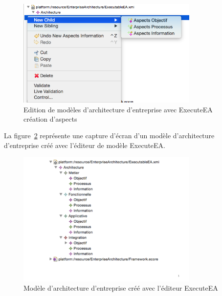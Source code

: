     \begin{figure}[!htbp]
     \begin{center}
      \includegraphics[width=0.8\textwidth]{figures/5_implementation/editeur_modele2.png}
     \end{center}
     \caption{Edition de modèles d'architecture d'entreprise avec ExecuteEA\\création d'aspects}
     \label{fig:editeur_modele2}
    \end{figure}

    La figure~\ref{fig:modeleEA} représente une capture d'écran d'un modèle d'architecture
    d'entreprise créé avec l'éditeur de modèle ExecuteEA.

    \begin{figure}[!htbp]
     \begin{center}
      \includegraphics[trim=0cm 3cm 0cm 0cm, width=0.8\textwidth]{figures/5_implementation/modele_ea.pdf}
     \end{center}
     \caption{Modèle d'architecture d'entreprise créé avec l'éditeur ExecuteEA}
     \label{fig:modeleEA}
    \end{figure}

